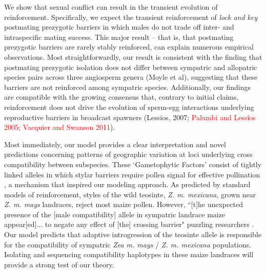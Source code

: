 \documentclass[11pt]{article}
\begin{document}
We show that sexual conflict can result in the transient evolution of reinforcement.  
Specifically, we expect the transient reinforcement of \textit{lock and key} postmating prezygotic barriers in which males do not trade off inter- and intraspecific mating success.  
This major result -- that is, that postmating prezygotic barriers are rarely stably reinforced,  can explain numerous empirical  observations.  
Most straightforwardly, our result is consistent with the finding that postmating prezygotic isolation does not differ between sympatric and allopatric species pairs across three angiosperm genera (Moyle et al), suggesting that these barriers are not reinforced among sympatric species.
Additionally, our findings are compatible with the growing consensus that, contrary to initial claims, reinforcement does not drive the evolution of sperm-egg interactions underlying reproductive barriers in broadcast spawners (Lessios, 2007; \textcolor{red}{Palumbi and Lessios 2005; Vacquier and Swanson 2011}). 

Most immediately, our model provides a clear interpretation and novel predictions concerning patterns of geographic variation at loci underlying cross compatibility between  subspecies. 
These `Gametophytic Factors' consist of tightly linked alleles in which stylar barriers require pollen signal for effective pollination \citep{Things}, a mechanism  that inspired our modeling approach.   %
As predicted by standard models of reinforcement, styles of  the wild teosinte, \textit{Z. m. mexicana}, grown near \textit{Z. m. mays} landraces, reject most maize pollen. 
However, ``[t]he  unexpected  presence  of  the [male compatibility] allele in sympatric landrace maize appear[ed]... to negate  any  effect  of  [the] crossing  barrier" puzzling researchers \citep{medyca paper}.   %
Our model predicts that adaptive introgression of the teosinte allele is responsible for the compatibility of sympatric \textit{Zea m. mays} / \textit{Z. m. mexicana} populations.  
Isolating and sequencing compatibility haplotypes in these maize landraces will provide a strong test of our theory. 
\end{document}
